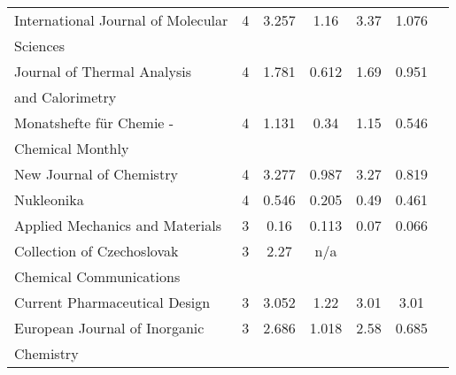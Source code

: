 \begin{longtable}[c]{lcccrcc}
  International Journal of Molecular                                                 & 4      & 3.257   & 1.16  &  3.37      & 1.076                 \\[0.5ex]
  Sciences                                                                           &        &         &       &            &                       \\[0.5ex]
  Journal of Thermal Analysis                                                        & 4      & 1.781   & 0.612 &  1.69      & 0.951                 \\[0.5ex]
  and Calorimetry                                                                    &        &         &       &            &                       \\[0.5ex]
  Monatshefte für Chemie -                                                           & 4      & 1.131   & 0.34  &  1.15      & 0.546                 \\[0.5ex]
  Chemical Monthly                                                                   &        &         &       &            &                       \\[0.5ex]
  New Journal of Chemistry                                                           & 4      & 3.277   & 0.987 &  3.27      & 0.819                 \\[0.5ex]
  Nukleonika                                                                         & 4      & 0.546   & 0.205 &  0.49      & 0.461                 \\[0.5ex]
  Applied Mechanics and Materials                                                    & 3      & 0.16    & 0.113 &  0.07      & 0.066                 \\[0.5ex]
  Collection of Czechoslovak                                                         & 3      & 2.27    & n/a   &            &                       \\[0.5ex]
 Chemical Communications                                                            &        &         &       &            &                       \\[0.5ex]
 Current Pharmaceutical Design                                                      & 3      & 3.052   & 1.22  &  3.01      & 3.01                  \\[0.5ex]
 European Journal of Inorganic                                                      & 3      & 2.686   & 1.018 &  2.58      & 0.685                 \\[0.5ex]
 Chemistry                                                                          &        &         &       &            &                       \\[0.5ex]

\end{longtable}

